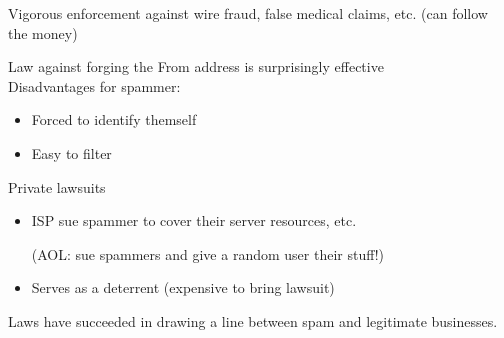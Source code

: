 Vigorous enforcement against wire fraud, false medical claims, etc. (can follow
the money)

Law against forging the From address is surprisingly effective\\
Disadvantages for spammer:
\begin{itemize}
    \item Forced to identify themself
    \item Easy to filter
\end{itemize}

Private lawsuits
\begin{itemize}
    \item ISP sue spammer to cover their server resources, etc.

    (AOL: sue spammers and give a random user their stuff!)
    \item Serves as a deterrent (expensive to bring lawsuit)
\end{itemize}

Laws have succeeded in drawing a line between spam and legitimate businesses. 

